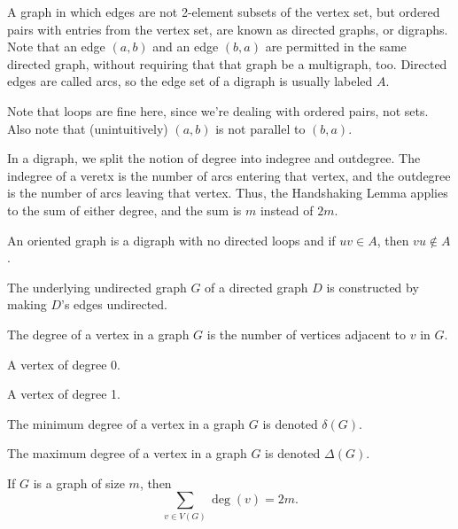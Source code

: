 \documentclass{article}
\begin{document}
\medskip{}

    A graph in which edges are not 2-element subsets of the vertex set, but ordered pairs with entries from the vertex set, are known as directed graphs, or digraphs. Note that an edge $(a,b)$ and an edge $(b,a)$ are permitted in the same directed graph, without requiring that that graph be a multigraph, too. Directed edges are called arcs, so the edge set of a digraph is usually labeled $A$.

    Note that loops are fine here, since we're dealing with ordered pairs, not sets.
    Also note that (unintuitively) $(a,b)$ is not parallel to $(b,a)$.

    In a digraph, we split the notion of degree into indegree and outdegree. The indegree of a veretx is the number of arcs entering that vertex, and the outdegree is the number of arcs leaving that vertex. Thus, the Handshaking Lemma applies to the sum of either degree, and the sum is $m$ instead of $2m$.

\medskip{}

    An oriented graph is a digraph with no directed loops and if $uv \in A$, then $vu \notin A$.

\medskip{}

    The underlying undirected graph $G$ of a directed graph $D$ is constructed by making $D$'s edges undirected.

\medskip{}

    The degree of a vertex in a graph $G$ is the number of vertices adjacent to $v$ in $G$.

\medskip{}

    A vertex of degree 0.

\medskip{}

    A vertex of degree 1.

\medskip{}

    The minimum degree of a vertex in a graph $G$ is denoted $\delta(G)$.

    The maximum degree of a vertex in a graph $G$ is denoted $\Delta(G)$.

\medskip{}

    If $G$ is a graph of size $m$, then $$\sum_{v \in V(G)} \deg(v) = 2m.$$
\end{document}

